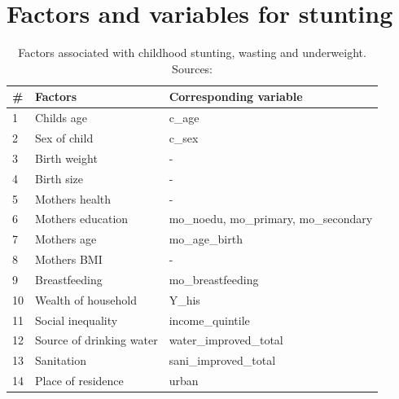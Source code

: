\documentclass[a4paper, 11pt]{article} %
\begin{document}
\section{Factors and variables for stunting} \label{sec:appendix_tab_stunting}
\begin{table}[h!]
\begin{tabular}{@{}lll@{}}
\toprule
\# & \textbf{Factors} & \textbf{Corresponding variable} \\ \midrule
1 & Childs age & c\_age \\
2 & Sex of child & c\_sex  \\
3 & Birth weight & -  \\
4 & Birth size & - \\ \midrule

5 & Mothers health & - \\
6 & Mothers education & mo\_noedu, mo\_primary, mo\_secondary \\
7 & Mothers age  & mo\_age\_birth \\
8 & Mothers BMI & - \\
9 & Breastfeeding & mo\_breastfeeding \\ \midrule

10 & Wealth of household & Y\_his  \\
11 & Social inequality & income\_quintile \\
12 & Source of drinking water & water\_improved\_total  \\
13 & Sanitation &  sani\_improved\_total  \\
14 & Place of residence & urban  \\ \bottomrule
\end{tabular}
    \caption{Factors associated with childhood stunting, wasting and underweight. Sources: \cite{Akombi2017Aug} \cite{UNI18}}
    \label{table:stunting}
\end{table}

\newpage
\end{document}
